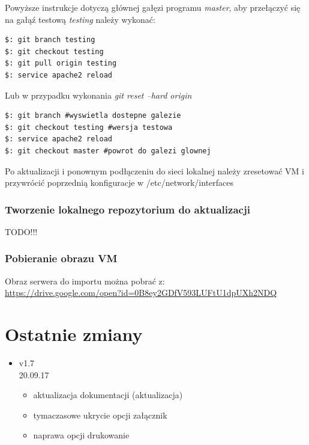 \documentclass[12pt,a4paper]{article}
\begin{document}
Powyższe instrukcje dotyczą głównej gałęzi programu \textit{master}, aby przełączyć się na gałąź testową \textit{testing} należy wykonać:
\begin{lstlisting}
$: git branch testing
$: git checkout testing
$: git pull origin testing
$: service apache2 reload
\end{lstlisting}
Lub w przypadku wykonania \textit{git reset --hard origin}
\begin{lstlisting}
$: git branch #wyswietla dostepne galezie
$: git checkout testing #wersja testowa
$: service apache2 reload
$: git checkout master #powrot do galezi glownej
\end{lstlisting}
Po aktualizacji i ponownym podłączeniu do sieci lokalnej należy zresetować VM i przywrócić poprzednią konfiguracje w /etc/network/interfaces
\subsubsection{Tworzenie lokalnego repozytorium do aktualizacji}
\begin{center}
TODO!!!
\end{center}
\subsubsection{Pobieranie obrazu VM}
Obraz serwera do importu można pobrać z:\\
 \url{https://drive.google.com/open?id=0B8ey2GDfV593LUFtU1dpUXh2NDQ}

\newpage
\section{Ostatnie zmiany}
\begin{itemize}
\item v1.7\\ 
20.09.17
\begin{itemize}
\item aktualizacja dokumentacji (aktualizacja)
\item tymaczasowe ukrycie opcji załącznik
\item naprawa opcji drukowanie
\end{itemize}
\end{itemize}
\end{document}
